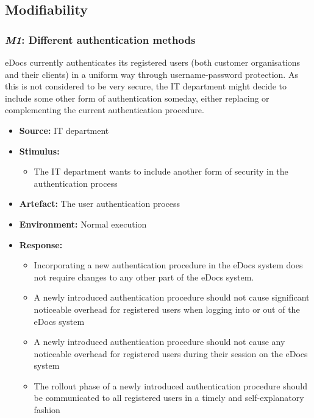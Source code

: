 \documentclass[a4paper,10pt]{article}
\begin{document}
\subsection{Modifiability}
\subsubsection{\emph{M1}: Different authentication methods}
eDocs currently authenticates its registered users (both customer organisations and their clients) in a uniform way through username-password protection. As this is not considered to be very secure, the IT department might decide to include some other form of authentication someday, either replacing or complementing the current authentication procedure.

\begin{itemize}
    \item \textbf{Source:} IT department
    \item \textbf{Stimulus:}
        \begin{itemize}
            \item The IT department wants to include another form of security in the authentication process
        \end{itemize}
    \item \textbf{Artefact:} The user authentication process
    \item \textbf{Environment:} Normal execution
    \item \textbf{Response:}
        \begin{itemize}
            \item Incorporating a new authentication procedure in the eDocs system does not require changes to any other part of the eDocs system.
            \item A newly introduced authentication procedure should not cause significant noticeable overhead for registered users when logging into or out of the eDocs system
            \item A newly introduced authentication procedure should not cause any noticeable overhead for registered users during their session on the eDocs system
            \item The rollout phase of a newly introduced authentication procedure should be communicated to all registered users in a timely and self-explanatory fashion
        \end{itemize}


\end{itemize}
\end{document}
